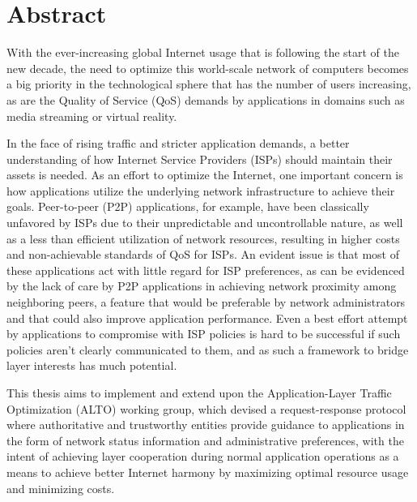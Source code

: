 \chapter{Abstract}

    With the ever-increasing global Internet usage that is following the start of the new decade, the need to optimize this world-scale network of computers becomes a big priority in the technological sphere that has the number of users increasing, as are the Quality of Service (QoS) demands by applications in domains such as media streaming or virtual reality.

    In the face of rising traffic and stricter application demands, a better understanding of how Internet Service Providers (ISPs) should maintain their assets is needed.
    As an effort to optimize the Internet, one important concern is how applications utilize the underlying network infrastructure to achieve their goals.
    Peer-to-peer (P2P) applications, for example, have been classically unfavored by ISPs due to their unpredictable and uncontrollable nature, as well as a less than efficient utilization of network resources, resulting in higher costs and non-achievable standards of QoS for ISPs.
    An evident issue is that most of these applications act with little regard for ISP preferences, as can be evidenced by the lack of care by P2P applications in achieving network proximity among neighboring peers, a feature that would be preferable by network administrators and that could also improve application performance.
    Even a best effort attempt by applications to compromise with ISP policies is hard to be successful if such policies aren't clearly communicated to them, and as such a framework to bridge layer interests has much potential.

    This thesis aims to implement and extend upon the Application-Layer Traffic Optimization (ALTO) working group, which devised a request-response protocol where authoritative and trustworthy entities provide guidance to applications in the form of network status information and administrative preferences, with the intent of achieving layer cooperation during normal application operations as a means to achieve better Internet harmony by maximizing optimal resource usage and minimizing costs.

